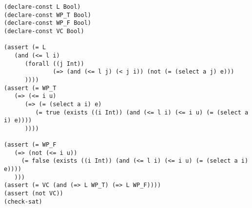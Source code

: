 \documentclass{article}
\begin{document}
\begin{enumerate}
\begin{enumerate}[(1)]
\begin{verbatim}
(declare-const L Bool)
(declare-const WP_T Bool)
(declare-const WP_F Bool)
(declare-const VC Bool)

(assert (= L
   (and (<= l i)
      (forall ((j Int))
              (=> (and (<= l j) (< j i)) (not (= (select a j) e)))
      ))))
(assert (= WP_T
   (=> (<= i u)
      (=> (= (select a i) e)
         (= true (exists ((i Int)) (and (<= l i) (<= i u) (= (select a i) e))))
      ))))

(assert (= WP_F
   (=> (not (<= i u))
     (= false (exists ((i Int)) (and (<= l i) (<= i u) (= (select a i) e))))
   )))
(assert (= VC (and (=> L WP_T) (=> L WP_F))))
(assert (not VC))
(check-sat)
\end{verbatim}


\end{enumerate}
\end{enumerate}
\end{document}
